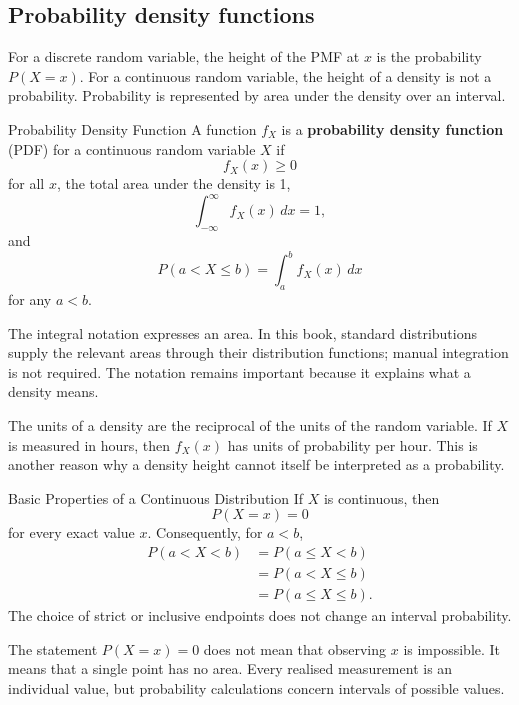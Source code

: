 \subsection{Probability density functions}

For a discrete random variable, the height of the PMF at $x$ is the probability $P(X=x)$. For a continuous random variable, the height of a density is not a probability. Probability is represented by area under the density over an interval.

\begin{definition}{Probability Density Function}
A function $f_X$ is a \textbf{probability density function} (PDF) for a continuous random variable $X$ if
\[
    f_X(x)\geq 0
\]
for all $x$, the total area under the density is 1,
\[
    \int_{-\infty}^{\infty} f_X(x)\,dx=1,
\]
and
\[
    P(a<X\leq b)=\int_a^b f_X(x)\,dx
\]
for any $a<b$.
\end{definition}

The integral notation expresses an area. In this book, standard distributions supply the relevant areas through their distribution functions; manual integration is not required. The notation remains important because it explains what a density means.

The units of a density are the reciprocal of the units of the random variable. If $X$ is measured in hours, then $f_X(x)$ has units of probability per hour. This is another reason why a density height cannot itself be interpreted as a probability.

\begin{theorem}{Basic Properties of a Continuous Distribution}
If $X$ is continuous, then
\[
    P(X=x)=0
\]
for every exact value $x$. Consequently, for $a<b$,
\[
\begin{aligned}
P(a<X<b)
  &=P(a\leq X<b)\\
  &=P(a<X\leq b)\\
  &=P(a\leq X\leq b).
\end{aligned}
\]
The choice of strict or inclusive endpoints does not change an interval probability.
\end{theorem}

The statement $P(X=x)=0$ does not mean that observing $x$ is impossible. It means that a single point has no area. Every realised measurement is an individual value, but probability calculations concern intervals of possible values.

